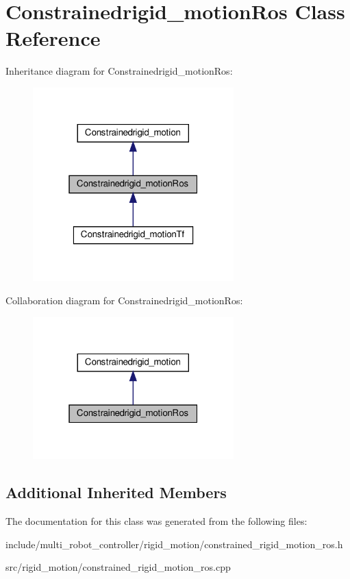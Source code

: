 \hypertarget{classConstrainedrigid__motionRos}{}\section{Constrainedrigid\+\_\+motion\+Ros Class Reference}
\label{classConstrainedrigid__motionRos}


Inheritance diagram for Constrainedrigid\+\_\+motion\+Ros\+:\nopagebreak
\begin{figure}[H]
\begin{center}
\leavevmode
\includegraphics[width=220pt]{d8/ddc/classConstrainedrigid__motionRos__inherit__graph}
\end{center}
\end{figure}


Collaboration diagram for Constrainedrigid\+\_\+motion\+Ros\+:\nopagebreak
\begin{figure}[H]
\begin{center}
\leavevmode
\includegraphics[width=220pt]{db/db2/classConstrainedrigid__motionRos__coll__graph}
\end{center}
\end{figure}
\subsection*{Additional Inherited Members}


The documentation for this class was generated from the following files\+:\begin{DoxyCompactItemize}
\item 
include/multi\+\_\+robot\+\_\+controller/rigid\+\_\+motion/constrained\+\_\+rigid\+\_\+motion\+\_\+ros.\+h\item 
src/rigid\+\_\+motion/constrained\+\_\+rigid\+\_\+motion\+\_\+ros.\+cpp\end{DoxyCompactItemize}
